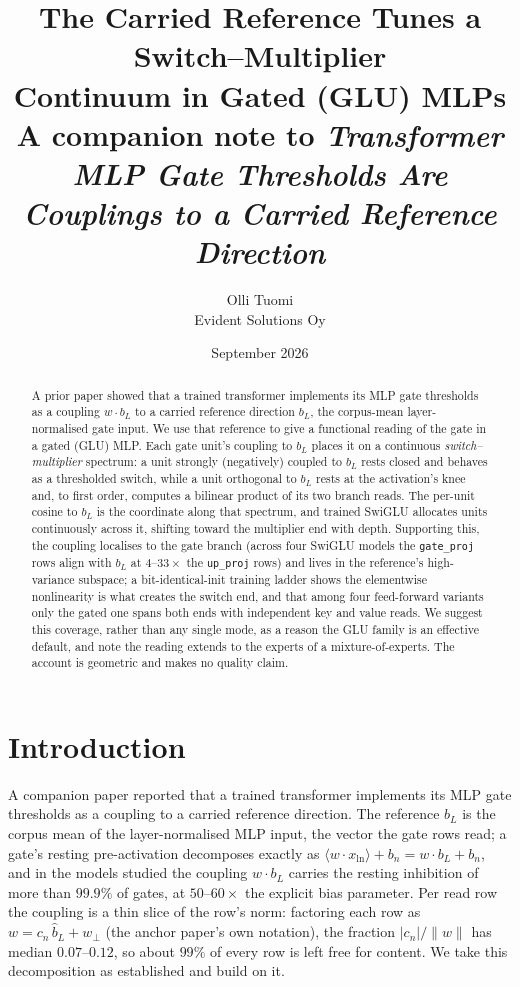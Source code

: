 \documentclass[11pt]{article}
\title{The Carried Reference Tunes a Switch--Multiplier\\Continuum in Gated (GLU) MLPs\\
\large A companion note to \emph{Transformer MLP Gate Thresholds Are Couplings
to a Carried Reference Direction}}
\author{Olli Tuomi\\Evident Solutions Oy}
\date{September 2026}
\newcommand{\bl}{b_L}
\newcommand{\blh}{\hat{b}_L}
\begin{document}
\maketitle

\begin{abstract}
A prior paper showed that a trained transformer implements its MLP gate
thresholds as a coupling $w\cdot\bl$ to a carried reference direction $\bl$, the
corpus-mean layer-normalised gate input. We use that reference to give a
functional reading of the gate in a gated (GLU) MLP. Each gate unit's coupling to
$\bl$ places it on a continuous \emph{switch--multiplier} spectrum: a unit
strongly (negatively) coupled to $\bl$ rests closed and behaves as a thresholded
switch, while a unit orthogonal to $\bl$ rests at the activation's knee and, to
first order, computes a bilinear product of its two branch reads. The per-unit
cosine to $\bl$ is the coordinate along that spectrum, and trained SwiGLU
allocates units continuously across it, shifting toward the multiplier end with
depth. Supporting this, the coupling localises to the gate branch (across four
SwiGLU models the \texttt{gate\_proj} rows align with $\bl$ at $4$--$33\times$ the
\texttt{up\_proj} rows) and lives in the reference's high-variance subspace; a
bit-identical-init training ladder shows the elementwise nonlinearity is what
creates the switch end, and that among four feed-forward variants only the gated
one spans both ends with independent key and value reads. We suggest this
coverage, rather than any single mode, as a reason the GLU family is an effective
default, and note the reading extends to the experts of a mixture-of-experts. The
account is geometric and makes no quality claim.
\end{abstract}

\section{Introduction}
\label{sec:intro}

A companion paper \citep{tuomi2026background} reported that a trained
transformer implements its MLP gate thresholds as a coupling to a carried
reference direction. The reference $\bl$ is the corpus mean of the
layer-normalised MLP input, the vector the gate rows read; a gate's resting
pre-activation decomposes exactly as $\langle w\cdot x_{\mathrm{ln}}\rangle + b_n
= w\cdot\bl + b_n$, and in the models studied the coupling $w\cdot\bl$ carries
the resting inhibition of more than $99.9\%$ of gates, at $50$--$60\times$ the
explicit bias parameter. Per read row the coupling is a thin slice of the row's
norm: factoring each row as $w = c_n\,\blh + w_\perp$ (the anchor paper's own
notation), the fraction $|c_n|/\lVert w\rVert$ has median $0.07$--$0.12$, so about $99\%$ of every row is
left free for content. We take this decomposition as established and build on it.
\end{document}
